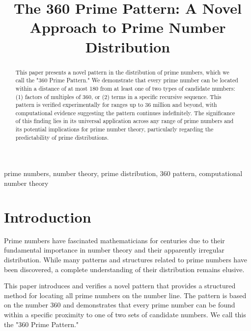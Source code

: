 \documentclass[conference]{IEEEtran}
\begin{document}
\title{The 360 Prime Pattern: A Novel Approach to Prime Number Distribution\\}

\author{
}

\maketitle

\begin{abstract}
This paper presents a novel pattern in the distribution of prime numbers, which we call the "360 Prime Pattern." We demonstrate that every prime number can be located within a distance of at most 180 from at least one of two types of candidate numbers: (1) factors of multiples of 360, or (2) terms in a specific recursive sequence. This pattern is verified experimentally for ranges up to 36 million and beyond, with computational evidence suggesting the pattern continues indefinitely. The significance of this finding lies in its universal application across any range of prime numbers and its potential implications for prime number theory, particularly regarding the predictability of prime distributions.
\end{abstract}

\begin{IEEEkeywords}
prime numbers, number theory, prime distribution, 360 pattern, computational number theory
\end{IEEEkeywords}

\section{Introduction}
Prime numbers have fascinated mathematicians for centuries due to their fundamental importance in number theory and their apparently irregular distribution. While many patterns and structures related to prime numbers have been discovered, a complete understanding of their distribution remains elusive.

This paper introduces and verifies a novel pattern that provides a structured method for locating all prime numbers on the number line. The pattern is based on the number 360 and demonstrates that every prime number can be found within a specific proximity to one of two sets of candidate numbers. We call this the "360 Prime Pattern."
\end{document}
